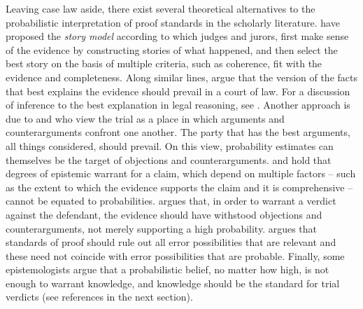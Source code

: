 \documentclass{article}
\begin{document}
Leaving case law aside, there exist several theoretical alternatives to the probabilistic interpretation of proof standards in the scholarly literature. 
\cite{Pennington1991, penn1993} have proposed the \textit{story model}   according to which judges and jurors, first make sense of the evidence by constructing stories of what happened, and then select the best story on the basis of multiple criteria, such as coherence, fit with the evidence and completeness.
Along similar lines, \cite{Pardo2008Judicial-Proof-} argue that the version of the facts that best explains the evidence should prevail in a court of law. For a discussion of inference to the best explanation in legal reasoning, see  \cite{schwartz2019WhatRelativePlausibility,hastie2019CaseRelativePlausibilitya,lai2019HowPlausibleRelative,nance2019LimitationsRelativePlausibility}.
%
Another approach is due to \cite{gordon2007} and \cite{prakken2009} who view the trial as a place in which  arguments and counterarguments confront one another.  The party that has the best arguments, all things considered, should prevail.  On this view, probability estimates can themselves be the target of objections and counterarguments. 
\cite{ho2008philosophy} and \cite{Haack2014-HAAEMS} %
hold that degrees of epistemic warrant for a claim, which depend on multiple factors -- such as the extent to which the evidence supports the claim and it is comprehensive -- cannot be equated to probabilities.  \cite{stein2008} argues that,  in order to warrant a verdict against the defendant, the evidence should have withstood objections and counterarguments, not merely supporting a high probability. \cite{gardiner2019ppa} argues that standards of proof should rule out all error possibilities that are relevant and these need not coincide with error possibilities that are probable. Finally, some epistemologists  argue that a probabilistic belief, no matter how high, is not enough to warrant knowledge, and knowledge should be the standard for trial verdicts (see references in the next section).


 

\end{document}
